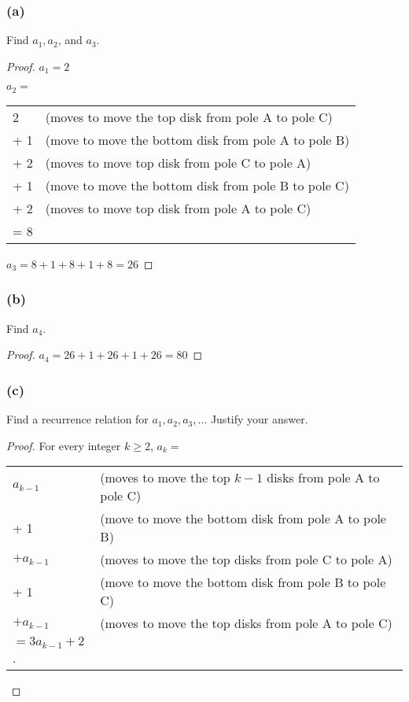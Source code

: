 \documentclass[14pt]{extarticle}
\begin{document}
\subsubsection{(a)}
Find $a_1, a_2$, and $a_3$.

\begin{proof}
    $a_1 = 2$

    $a_2 =$

    \begin{tabular}{ll}
        2   & (moves to move the top disk from pole A to pole C)   \\
        + 1 & (move to move the bottom disk from pole A to pole B) \\
        + 2 & (moves to move top disk from pole C to pole A)       \\
        + 1 & (move to move the bottom disk from pole B to pole C) \\
        + 2 & (moves to move top disk from pole A to pole C)       \\
        = 8 &
    \end{tabular}

    $a_3 = 8 + 1 + 8 + 1 + 8 = 26$
\end{proof}

\subsubsection{(b)}
Find $a_4$.

\begin{proof}
    $a_4 = 26 + 1 + 26 + 1 + 26 = 80$
\end{proof}

\subsubsection{(c)}
Find a recurrence relation for $a_1, a_2, a_3, \ldots$ Justify your answer.

\begin{proof}
    For every integer $k \geq 2$, $a_k =$

    \begin{tabular}{ll}
        $a_{k-1}$         & (moves to move the top $k - 1$ disks from pole A to pole C) \\
        + 1               & (move to move the bottom disk from pole A to pole B)        \\
        $+ a_{k-1}$       & (moves to move the top disks from pole C to pole A)         \\
        + 1               & (move to move the bottom disk from pole B to pole C)        \\
        $+ a_{k-1}$       & (moves to move the top disks from pole A to pole C)         \\
        $= 3a_{k-1} + 2$. &
    \end{tabular}
\end{proof}
\end{document}
